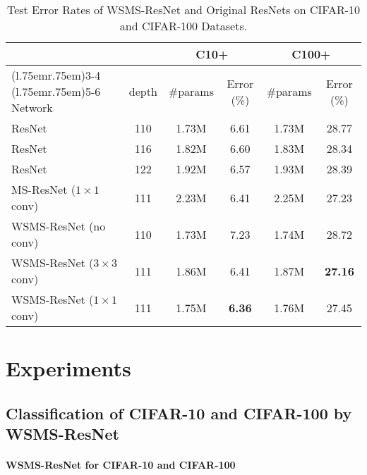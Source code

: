 \documentclass[journal]{IEEEtran}
\begin{document}
\begin{table*}[!t]
\renewcommand{\arraystretch}{1.3}
\caption{Test Error Rates of WSMS-ResNet and Original ResNets on CIFAR-10 and CIFAR-100 Datasets.}
\centering
\label{tab:WSMS-ResNet_CIFAR-10}
\begin{tabular}{lccccc}
  \toprule
    & & \multicolumn{2}{c}{C10+} & \multicolumn{2}{c}{C100+} \\
  \cmidrule(l{.75em}r{.75em}){3-4}
  \cmidrule(l{.75em}r{.75em}){5-6}
    Network & depth & \#params & Error (\%) & \#params & Error (\%) \\
  \midrule
    ResNet                        & 110   & 1.73M    & 6.61 & 1.73M & 28.77 \\
    ResNet                        & 116   & 1.82M    & 6.60 & 1.83M & 28.34 \\
    ResNet                        & 122   & 1.92M    & 6.57 & 1.93M & 28.39 \\
    MS-ResNet ($1\times1$ conv)   & 111   & 2.23M    & 6.41 & 2.25M & 27.23 \\
  \midrule
    WSMS-ResNet (no conv)         & 110   & 1.73M    & 7.23 & 1.74M & 28.72 \\
    WSMS-ResNet ($3\times3$ conv) & 111   & 1.86M    & 6.41 & 1.87M & \textbf{27.16} \\
    WSMS-ResNet ($1\times1$ conv) & 111   & 1.75M    & \textbf{6.36} & 1.76M & 27.45 \\
  \bottomrule
\end{tabular}
\end{table*}

\section{Experiments}
\label{chp:exp}

\subsection{Classification of CIFAR-10 and CIFAR-100 by WSMS-ResNet}

\paragraph*{\textbf{WSMS-ResNet for CIFAR-10 and CIFAR-100}}
\end{document}
